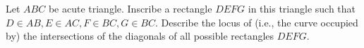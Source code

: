Let $ABC$ be acute triangle. Inscribe a rectangle $DEFG$ in this triangle such that $D\in AB,E\in AC,F\in BC,G\in BC$. Describe the locus of (i.e., the curve occupied by) the intersections of the diagonals of all possible rectangles $DEFG$.